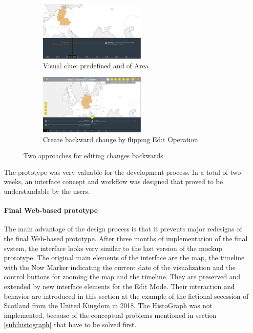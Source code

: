 \begin{figure}[ht]
\centering
\begin{subfigure}[b]{.5\textwidth}
  \centering
  \includegraphics[width=200px]{graphics/development/design_process/backward_change_1.png}
  \caption{Visual clue: predefined and of Area}
  \label{sfig:backward_change_1}
\end{subfigure}%
\begin{subfigure}[b]{.5\textwidth}
  \centering
  \includegraphics[width=200px]{graphics/development/design_process/backward_change_2.png}
  \caption{Create backward change by flipping Edit Operation}
  \label{sfig:backward_change_2}
\end{subfigure}
\caption{Two approaches for editing changes backwards}
\label{fig:backward_change}
\end{figure}

The prototype was very valuable for the development process. In a total of two weeks, an interface concept and workflow was designed that proved to be understandable by the users.



\paragraph{Final Web-based prototype} %
\label{par:final_web_based_prototype}

The main advantage of the design process is that it prevents major redesigns of the final Web-based prototype. After three months of implementation of the final system, the interface looks very similar to the last version of the mockup prototype. The original main elements of the interface are the map, the timeline with the Now Marker indicating the current date of the visualization and the control buttons for zooming the map and the timeline. They are preserved and extended by new interface elements for the Edit Mode. Their interaction and behavior are introduced in this section at the example of the fictional secession of Scotland from the United Kingdom in 2018. The HistoGraph was not implemented, because of the conceptual problems mentioned in section \ref{sub:histograph} that have to be solved first.

